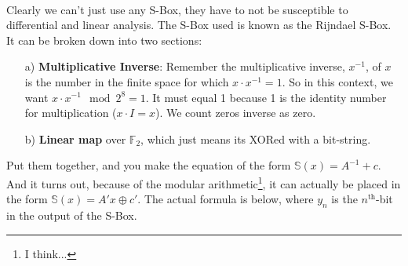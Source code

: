    \\
    Clearly we can't just use any S-Box, they have to not be susceptible to differential and linear analysis. The S-Box used is known as the Rijndael S-Box. It can be broken down into two sections:
    \begin{enumerate}
        \item[a)] \textbf{Multiplicative Inverse}: Remember the multiplicative inverse, $x^{-1}$, of $x$ is the number in the finite space for which $x\cdot x^{-1}=1$. So in this context, we want $x\cdot x^{-1} \mod 2^8 = 1$. It must equal 1 because 1 is the identity number for multiplication ($x\cdot I=x$). We count zeros inverse as zero.
        \item[b)] \textbf{Linear map} over $\mathbb{F}_2$, which just means its XORed with a bit-string.
    \end{enumerate}
    Put them together, and you make the equation of the form $\mathbb{S}(x)=A^{-1}+c$. And it turns out, because of the modular arithmetic\footnote{I think...}, it can actually be placed in the form $\mathbb{S}(x) = A'x\oplus c'$. The actual formula is below, where $y_n$ is the $n^\textrm{th}$-bit in the output of the S-Box.\\

